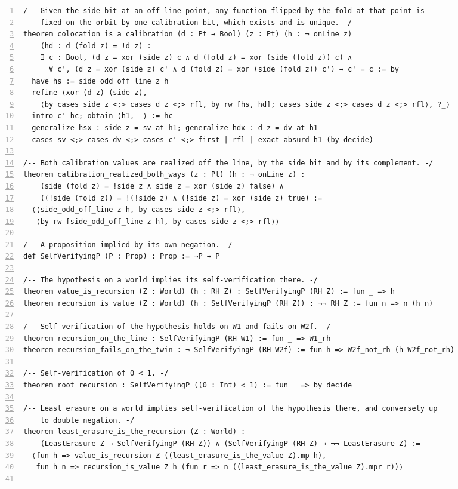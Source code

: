 \documentclass[10pt]{article}
\newcommand{\leansize}{\fontsize{5.5pt}{6.75pt}\selectfont}
\begin{document}
\begin{multicols}{2}
\begin{Verbatim}[numbers=left,firstnumber=1,numbersep=3pt,xleftmargin=2.6em,breaklines=true,breakanywhere=true,breakautoindent=false,breakindent=1.4em,breaksymbolleft={},breakanywheresymbolpre={},fontsize=\leansize]
/-- Given the side bit at an off-line point, any function flipped by the fold at that point is
    fixed on the orbit by one calibration bit, which exists and is unique. -/
theorem colocation_is_a_calibration (d : Pt → Bool) (z : Pt) (h : ¬ onLine z)
    (hd : d (fold z) = !d z) :
    ∃ c : Bool, (d z = xor (side z) c ∧ d (fold z) = xor (side (fold z)) c) ∧
      ∀ c', (d z = xor (side z) c' ∧ d (fold z) = xor (side (fold z)) c') → c' = c := by
  have hs := side_odd_off_line z h
  refine ⟨xor (d z) (side z),
    ⟨by cases side z <;> cases d z <;> rfl, by rw [hs, hd]; cases side z <;> cases d z <;> rfl⟩, ?_⟩
  intro c' hc; obtain ⟨h1, -⟩ := hc
  generalize hsx : side z = sv at h1; generalize hdx : d z = dv at h1
  cases sv <;> cases dv <;> cases c' <;> first | rfl | exact absurd h1 (by decide)

/-- Both calibration values are realized off the line, by the side bit and by its complement. -/
theorem calibration_realized_both_ways (z : Pt) (h : ¬ onLine z) :
    (side (fold z) = !side z ∧ side z = xor (side z) false) ∧
    ((!side (fold z)) = !(!side z) ∧ (!side z) = xor (side z) true) :=
  ⟨⟨side_odd_off_line z h, by cases side z <;> rfl⟩,
   ⟨by rw [side_odd_off_line z h], by cases side z <;> rfl⟩⟩

/-- A proposition implied by its own negation. -/
def SelfVerifyingP (P : Prop) : Prop := ¬P → P

/-- The hypothesis on a world implies its self-verification there. -/
theorem value_is_recursion (Z : World) (h : RH Z) : SelfVerifyingP (RH Z) := fun _ => h
theorem recursion_is_value (Z : World) (h : SelfVerifyingP (RH Z)) : ¬¬ RH Z := fun n => n (h n)

/-- Self-verification of the hypothesis holds on W1 and fails on W2f. -/
theorem recursion_on_the_line : SelfVerifyingP (RH W1) := fun _ => W1_rh
theorem recursion_fails_on_the_twin : ¬ SelfVerifyingP (RH W2f) := fun h => W2f_not_rh (h W2f_not_rh)

/-- Self-verification of 0 < 1. -/
theorem root_recursion : SelfVerifyingP ((0 : Int) < 1) := fun _ => by decide

/-- Least erasure on a world implies self-verification of the hypothesis there, and conversely up
    to double negation. -/
theorem least_erasure_is_the_recursion (Z : World) :
    (LeastErasure Z → SelfVerifyingP (RH Z)) ∧ (SelfVerifyingP (RH Z) → ¬¬ LeastErasure Z) :=
  ⟨fun h => value_is_recursion Z ((least_erasure_is_the_value Z).mp h),
   fun h n => recursion_is_value Z h (fun r => n ((least_erasure_is_the_value Z).mpr r))⟩


\end{Verbatim}
\end{multicols}
\end{document}
